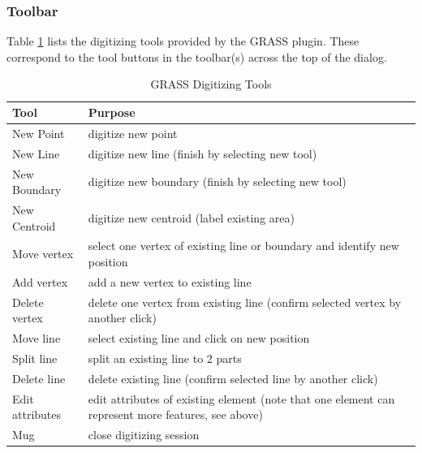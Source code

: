 \documentclass[10pt,english]{article}
\begin{document}
\begin{onehalfspace}
\subsubsection{Toolbar}
Table \ref{tab:grass_tools} lists the digitizing tools provided by the GRASS plugin. These correspond to the tool buttons in the toolbar(s) across the top of the dialog.
\begin{table}[h]

\centering
\caption{GRASS Digitizing Tools}\label{tab:grass_tools}\medskip
 \begin{tabular}{|l|p{5in}|}
 \hline \textbf{Tool} & \textbf{Purpose} \\
\hline New Point & digitize new point \\
\hline New Line &  digitize new line (finish by selecting new tool) \\
\hline New Boundary & digitize new boundary (finish by selecting new tool)\\
\hline New Centroid & digitize new centroid (label existing area)\\
\hline Move vertex & select one vertex of existing line or boundary and identify new position\\
\hline Add vertex & add a new vertex to existing line\\
\hline Delete vertex & delete one vertex from existing line (confirm selected vertex by another click)\\
\hline Move line & select existing line and click on new position\\
\hline Split line & split an existing line to 2 parts\\
\hline Delete line & delete existing line (confirm selected line by another click)\\
\hline Edit attributes & edit attributes of existing element (note that one element can represent more features, see above)\\
\hline Mug & close digitizing session\\
\hline
\end{tabular}
\end{table}

\end{onehalfspace}
\end{document}
